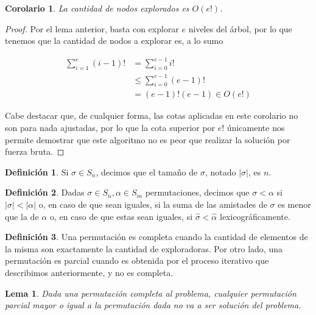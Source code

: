 \documentclass{article}
\newtheorem{corollary}{Corolario}[theorem]
\newtheorem{lemma}{Lema}[theorem]
\theoremstyle{definition}
\newtheorem{definition}{Definición}[section]
\theoremstyle{remark}
\begin{document}
\begin{corollary}
La cantidad de nodos explorados es $O(e!)$.
\end{corollary}

\begin{proof}
Por el lema anterior, basta con explorar $e$ niveles del árbol, por lo que tenemos que la cantidad de nodos a explorar es, a lo sumo

\begin{equation}
\begin{aligned}
\sum_{i=1}^{e} (i-1)! &= \sum_{i=0}^{e-1} i! \\
&\leq \sum_{i=0}^{e-1} (e-1)! \\
&= (e-1)! (e-1) \in O(e!)
\end{aligned}
\end{equation}

Cabe destacar que, de cualquier forma, las cotas aplicadas en este corolario no son para nada ajustadas, por lo que la cota superior por $e!$ únicamente nos permite demostrar que este algoritmo no es peor que realizar la solución por fuerza bruta.
\end{proof}

\begin{definition}
Si $\sigma \in S_n$, decimos que el tamaño de $\sigma$, notado $|\sigma|$, es $n$.
\end{definition}

\begin{definition}
Dadas $\sigma \in S_n, \alpha \in S_m$ permutaciones, decimos que $\sigma < \alpha$ si $|\sigma| < |\alpha|$ o, en caso de que sean iguales, si la suma de las amistades de $\sigma$ es menor que la de $\alpha$ o, en caso de que estas sean iguales, si $\hat{\sigma} < \hat{\alpha}$ lexicográficamente.
\end{definition}

\begin{definition}
Una permutación es completa cuando la cantidad de elementos de la misma son exactamente la cantidad de exploradoras. Por otro lado, una permutación es parcial cuando es obtenida por el proceso iterativo que describimos anteriormente, y no es completa.
\end{definition}

\begin{lemma}
Dada una permutación completa al problema, cualquier permutación parcial mayor o igual a la permutación dada no va a ser solución del problema.
\end{lemma}
\end{document}
